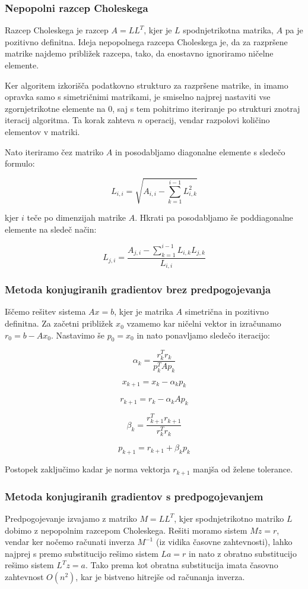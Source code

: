 \documentclass[12pt,a4paper]{article}
\begin{document}
\subsubsection{Nepopolni razcep Choleskega}
Razcep Choleskega je razcep $A=LL^T$, kjer je $L$ spodnjetrikotna matrika, $A$ pa je pozitivno definitna. Ideja nepopolnega razcepa Choleskega je, da za razpršene matrike najdemo približek razcepa, tako, da enostavno ignoriramo ničelne elemente. 


Ker algoritem izkorišča podatkovno strukturo za razpršene matrike, in imamo opravka samo s simetričnimi matrikami, je smiselno  najprej nastaviti vse zgornjetrikotne elemente na 0, saj s tem pohitrimo iteriranje po strukturi znotraj iteracij algoritma.  Ta korak zahteva $n$ operacij, vendar razpolovi količino elementov v matriki. 


Nato iteriramo čez matriko $A$ in posodabljamo diagonalne elemente s sledečo formulo:


\[
L_{i,i} = \sqrt{A_{i,i} - \sum_{k=1}^{i-1}L_{i,k}^2}
\]

kjer $i$ teče po dimenzijah matrike $A$. Hkrati pa posodabljamo še poddiagonalne elemente na sledeč način:


\[
L_{j,i} = \frac{A_{j,i}-\sum_{k=1}^{i-1}L_{i,k}L_{j,k}}{L_{i,i}}
\]

\subsubsection{Metoda konjugiranih gradientov brez predpogojevanja}
Iščemo rešitev sistema $Ax=b$, kjer je matrika $A$ simetrična in pozitivno definitna. Za začetni približek $x_0$ vzamemo kar ničelni vektor in izračunamo $r_0 = b - Ax_0$. Nastavimo še $p_0=x_0$ in nato ponavljamo sledečo iteracijo:


\[
\alpha_k=\frac{r_k^Tr_k}{p_k^TAp_k}
\]

\[
x_{k+1}=x_k-\alpha_kp_k
\]

\[
r_{k+1}=r_k-\alpha_kAp_k
\]

\[
\beta_k=\frac{r_{k+1}^Tr_{k+1}}{r_k^Tr_k}
\]

\[
p_{k+1}=r_{k+1}+\beta_kp_k
\]

Postopek zaključimo kadar je norma vektorja $r_{k+1}$ manjša od želene tolerance.


\subsubsection{Metoda konjugiranih gradientov s predpogojevanjem}
Predpogojevanje izvajamo z matriko $M=LL^T$, kjer spodnjetrikotno matriko $L$ dobimo z nepopolnim razcepom Choleskega. Rešiti moramo sistem $Mz=r$, vendar ker nočemo računati inverza $M^{-1}$ (iz vidika časovne zahtevnosti), lahko najprej s premo substitucijo rešimo sistem $La=r$ in nato z obratno substitucijo rešimo sistem $L^Tz=a$.  Tako prema kot obratna substitucija imata časovno zahtevnost $O(n^2)$, kar je bistveno hitrejše od računanja inverza.
\end{document}
